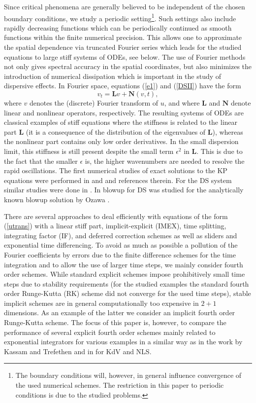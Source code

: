 \documentclass[final]{siamltex}
\begin{document}
Since critical phenomena are generally believed to be independent of 
the chosen boundary conditions, we study a periodic 
setting\footnote{The boundary conditions will, however, in general 
influence convergence of the used numerical schemes. The 
restriction in this paper to periodic conditions is due to the studied 
problems.}. Such 
settings also include rapidly decreasing functions which can be 
periodically continued as smooth functions within the finite numerical precision. 
This allows one to approximate the spatial dependence 
via truncated Fourier series which leads for
the studied equations to large stiff systems of ODEs, see below. 
The use of 
Fourier methods not only gives spectral accuracy in the spatial 
coordinates, but also minimizes the introduction of numerical 
dissipation which is important in the study of dispersive effects.
In 
Fourier space, equations (\ref{e1}) and (\ref{DSII}) have the form
\begin{equation}
    v_{t}=\mathbf{L}v+\mathbf{N}(v,t)
    \label{utrans},
\end{equation}
where $v$ denotes the (discrete) Fourier transform of $u$, 
and where $\mathbf{L}$ and $\mathbf{N}$ denote linear and nonlinear 
operators, respectively. The resulting systems of ODEs are classical examples of stiff equations where the 
stiffness is related to the linear part $\mathbf{L}$ (it is 
a consequence of the distribution of the eigenvalues of 
$\mathbf{L}$), whereas the 
nonlinear part contains only low order derivatives. In the small dispersion 
limit, this stiffness is still present despite the small term 
$\epsilon^{2}$ in $\mathbf{L}$. This is due to the fact that the 
smaller $\epsilon$ is, the higher wavenumbers are needed to 
resolve the rapid oscillations. The first numerical studies of exact 
solutions to the KP equations were performed in \cite{WMGSS} and 
\cite{XS} and references therein. For the 
DS system similar studies were done in \cite{WW}. In \cite{BMS} 
blowup for DS was studied for the analytically known blowup solution 
by Ozawa \cite{Oza}.

There are several approaches to 
deal efficiently with equations of the form (\ref{utrans}) with a 
linear stiff part, implicit-explicit (IMEX), time splitting, 
integrating factor (IF), and deferred correction schemes as well as 
sliders and exponential time differencing. 
To avoid as much as possible a pollution of the Fourier coefficients 
by errors due to the finite difference schemes for the time 
integration and to allow the use of larger time steps, we mainly consider fourth order schemes.
While standard explicit schemes impose prohibitively small time 
steps due to stability requirements (for the studied examples the 
standard fourth order Runge-Kutta (RK) scheme did not converge for the 
used time steps), stable implicit schemes are in 
general 
computationally too expensive in $2+1$ dimensions. As an example of 
the latter we consider an implicit fourth order Runge-Kutta scheme. 
The focus of this paper is, however, to 
compare the performance of several explicit fourth order schemes mainly related to 
exponential integrators for various examples in a similar way as in 
the work by Kassam and Trefethen \cite{KassT} and in \cite{ckkdvnls} for 
KdV and NLS. 
\end{document}
